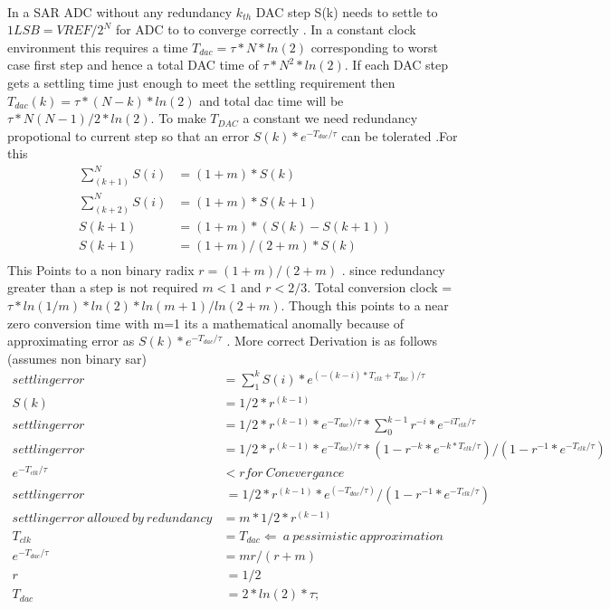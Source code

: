 \documentclass[a4paper,10pt,fleqn,titlepage,twoside]{article}
\begin{document}
\paragraph{}
	In a SAR ADC without any redundancy $k_{th}$ DAC step S(k) needs to settle to $1LSB = VREF/2^{N}$ for ADC to 
to converge correctly . In a constant clock environment this requires a time $T_{dac}=\tau*N*ln(2)$ corresponding to worst case first step and hence a total
DAC time of $\tau*N^{2}*ln(2)$. If each DAC step gets a settling time just enough to meet the settling requirement then $T_{dac}(k)=\tau*(N-k)*ln(2)$ and total dac
time will be $\tau*N(N-1)/2*ln(2)$. To make $T_{DAC}$ a constant we need redundancy propotional to current step so that an error $S(k)*e^{-T_{dac}/\tau}$ can be tolerated
.For this 
\begin{align*}
\sum_{(k+1)}^N{S(i)} &= (1+m)*S(k)\\
\sum_{(k+2)}^N{S(i)} &= (1+m)*S(k+1)\\
S(k+1) &= (1+m)*(S(k)-S(k+1))\\
S(k+1) &= (1+m)/(2+m)*S(k)\\
\end{align*}
This Points to a non binary radix $r=(1+m)/(2+m)$ . since redundancy greater than a step is not required $m<1$ and $r<2/3$. Total conversion clock = $\tau*ln(1/m)*ln(2)*ln(m+1)/ln(2+m)$.
Though this points to a near zero conversion time with m=1 its a mathematical anomally because of approximating error as $S(k)*e^{-T_{dac}/\tau}$ . More correct Derivation
is as follows (assumes non binary sar)
\begin{align*}
settling error &= \sum_1^k{S(i)*e^{(-(k-i)*T_{clk}+T_{dac})/\tau}}\\
S(k)&=1/2*r^{(k-1)}\\
settling error &= 1/2*r^{(k-1)}*e^{-T_{dac})/\tau}*\sum_0^{k-1}{r^{-i}*e^{-iT_{clk}/\tau}}\\
settling error &= 1/2*r^{(k-1)}*e^{-T_{dac})/\tau}*(1-r^{-k}*e^{-k*T_{clk}/\tau})/(1-r^{-1}*e^{-T_{clk}/\tau})\\
e^{-T_{clk}/\tau} &< r for\:Conevergance\\
settling error &~= 1/2*r^{(k-1)}*e^{(-T_{dac}/\tau)}/(1-r^{-1}*e^{-T_{clk}/\tau})\\
settlingerror\:allowed\:by\:redundancy &= m*1/2*r^{(k-1)}\\
T_{clk}&=T_{dac}\Leftarrow\:a\:pessimistic\:approximation\:\\
e^{-T_{dac}/\tau} &= mr/(r+m)\\
r&~=1/2\\
T_{dac} &~= 2*ln(2)*\tau;
\end{align*}
\newpage
\end{document}
